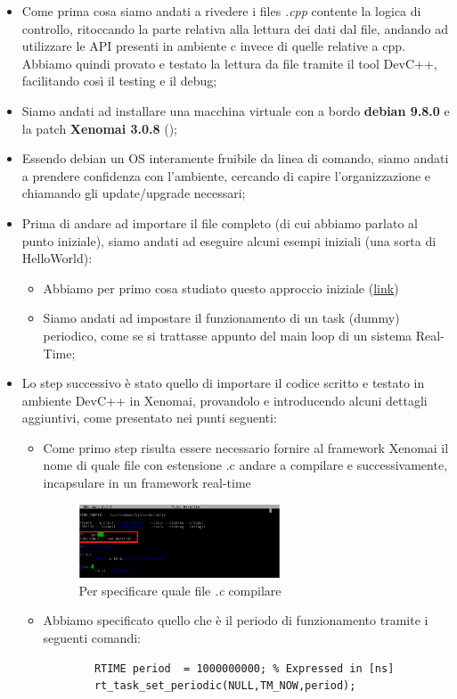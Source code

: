 \begin{itemize}
	\item Come prima cosa siamo andati a rivedere i files \textit{.cpp} contente la logica di controllo, ritoccando la parte relativa alla lettura dei dati dal file, andando ad utilizzare le API presenti in ambiente c invece di quelle relative a cpp.
	Abbiamo quindi provato e testato la lettura da file tramite il tool DevC++, facilitando così il testing e il debug;
	\item Siamo andati ad installare una macchina virtuale con a bordo \textbf{debian 9.8.0} e la patch \textbf{Xenomai 3.0.8} (\cite{xenomai});
	\item Essendo debian un OS interamente fruibile da linea di comando, siamo andati a prendere confidenza con l'ambiente, cercando di capire l'organizzazione e chiamando gli update/upgrade necessari;
	\item Prima di andare ad importare il file completo (di cui abbiamo parlato al punto iniziale), siamo andati ad eseguire alcuni esempi iniziali (una sorta di HelloWorld):
	\begin{itemize}
		\item Abbiamo per primo cosa studiato questo approccio iniziale (\href{http://www.cs.ru.nl/J.Hooman/DES/XenomaiExercises/Exercise-1.html}{link})
		\item Siamo andati ad impostare il funzionamento di un task (dummy) periodico, come se si trattasse appunto del main loop di un sistema Real-Time;
	\end{itemize}
	
	\item Lo step successivo è stato quello di importare il codice scritto e testato in ambiente DevC++ in Xenomai, provandolo e introducendo alcuni dettagli aggiuntivi, come presentato nei punti seguenti:
	\begin{itemize}
		\item Come primo step risulta essere necessario fornire al framework Xenomai il nome di quale file con estensione .c andare a compilare e successivamente, incapsulare in un framework real-time
			\begin{figure}[H]
				\centering   	
				\includegraphics[width=0.6\textwidth]{Immagini/xenomai_nano_make.png}
				\caption{Per specificare quale file \textit{.c} compilare}
				\label{fig:xenomai_nano_make}
			\end{figure}
		\item Abbiamo specificato quello che è il periodo di funzionamento  tramite i seguenti comandi:
		\begin{lstlisting}
		RTIME period  = 1000000000; % Expressed in [ns]
		rt_task_set_periodic(NULL,TM_NOW,period);
		\end{lstlisting}
		

\end{itemize}
\end{itemize}
